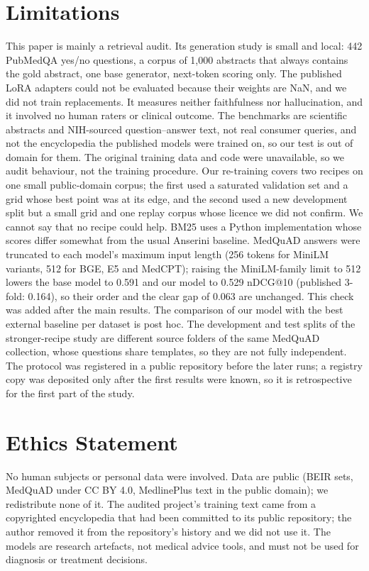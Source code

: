 \documentclass[11pt]{article}
\begin{document}
\section*{Limitations}
This paper is mainly a retrieval audit. Its generation study is small and local: 442 PubMedQA yes/no questions, a corpus of 1,000 abstracts that always contains the gold abstract, one base generator, next-token scoring only. The published LoRA adapters could not be evaluated because their weights are NaN, and we did not train replacements. It measures neither faithfulness nor hallucination, and it involved no human raters or clinical outcome. The benchmarks are scientific abstracts and NIH-sourced question--answer text, not real consumer queries, and not the encyclopedia the published models were trained on, so our test is out of domain for them. The original training data and code were unavailable, so we audit behaviour, not the training procedure. Our re-training covers two recipes on one small public-domain corpus; the first used a saturated validation set and a grid whose best point was at its edge, and the second used a new development split but a small grid and one replay corpus whose licence we did not confirm. We cannot say that no recipe could help. BM25 uses a Python implementation whose scores differ somewhat from the usual Anserini baseline. MedQuAD answers were truncated to each model's maximum input length (256 tokens for MiniLM variants, 512 for BGE, E5 and MedCPT); raising the MiniLM-family limit to 512 lowers the base model to 0.591 and our model to 0.529 nDCG@10 (published 3-fold: 0.164), so their order and the clear gap of 0.063 are unchanged. This check was added after the main results. The comparison of our model with the best external baseline per dataset is post hoc. The development and test splits of the stronger-recipe study are different source folders of the same MedQuAD collection, whose questions share templates, so they are not fully independent. The protocol was registered in a public repository before the later runs; a registry copy was deposited only after the first results were known, so it is retrospective for the first part of the study.

\section*{Ethics Statement}
No human subjects or personal data were involved. Data are public (BEIR sets, MedQuAD under CC BY 4.0, MedlinePlus text in the public domain); we redistribute none of it. The audited project's training text came from a copyrighted encyclopedia that had been committed to its public repository; the author removed it from the repository's history and we did not use it. The models are research artefacts, not medical advice tools, and must not be used for diagnosis or treatment decisions.
\end{document}
